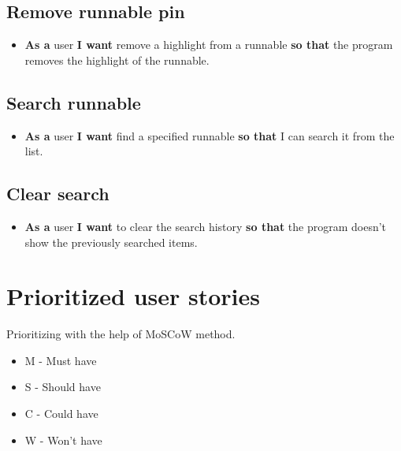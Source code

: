 \documentclass{article}
\begin{document}
\subsection{Remove runnable pin}
\begin{itemize}
    \item \textbf{As a} user \textbf{I want} remove a highlight from a runnable \textbf{so that} the program removes the highlight of the runnable.
\end{itemize}

\subsection{Search runnable}
\begin{itemize}
    \item \textbf{As a} user \textbf{I want} find a specified runnable \textbf{so that} I can search it from the list.
\end{itemize}

\subsection{Clear search}
\begin{itemize}
    \item \textbf{As a} user \textbf{I want} to clear the search history \textbf{so that} the program doesn't show the previously searched items.
\end{itemize}

\section{Prioritized user stories}

Prioritizing with the help of MoSCoW method.
\begin{itemize}
    \item M - Must have
    \item S - Should have
    \item C - Could have
    \item W - Won't have
\end{itemize}
\end{document}

